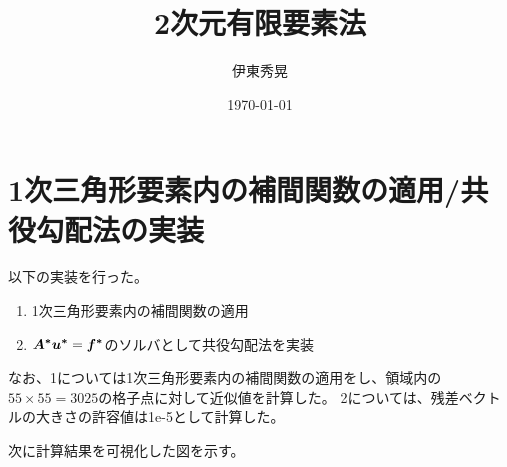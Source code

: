 \documentclass[a4paper,11pt]{jsarticle}
\begin{document}
\title{2次元有限要素法}
\author{伊東秀晃}
\date{\today}
\maketitle

\section*{1次三角形要素内の補間関数の適用/共役勾配法の実装}
以下の実装を行った。
\begin{enumerate}
  \item 1次三角形要素内の補間関数の適用
  \item \(\vb*{A^{*}}\vb*{u^{*}}=\vb*{f^{*}}\)のソルバとして共役勾配法を実装
\end{enumerate}
なお、1については1次三角形要素内の補間関数の適用をし、領域内の\(55\times55=3025\)の格子点に対して近似値を計算した。
2については、残差ベクトルの大きさの許容値は1e-5として計算した。

次に計算結果を可視化した図を示す。
\end{document}
